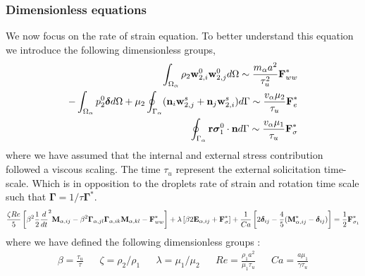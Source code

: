 \subsubsection{Dimensionless equations}
We now focus on the rate of strain equation. 
To better understand this equation we introduce the following dimensionless groups, 
\begin{align*}
    \int_{\Omega_\alpha} \rho_2 \textbf{w}_{2,i}^0\textbf{w}_{2,j}^0 d\Omega
    \sim \frac{m_\alpha a^2}{\tau_u^2} \textbf{F}_{ww}^*
    \\
    - \int_{\Omega_\alpha} p_2^0\bm\delta d\Omega
    + \mu_2 \oint_{\Gamma_\alpha} (\textbf{n}_i \textbf{w}_{2,j}^s + \textbf{n}_j \textbf{w}_{2,i}^s) d\Gamma
    \sim \frac{v_\alpha \mu_2}{\tau_u} \textbf{F}_{e}^*
    \\
    \oint_{\Gamma_\alpha} \textbf r \bm\sigma_1^0 \cdot \textbf{n} d\Gamma
    \sim 
    \frac{v_\alpha \mu_1}{\tau_u} \textbf{F}_{\sigma}^*
\end{align*} 
where we have assumed that the internal and external stress contribution followed a viscous scaling. 
The time $\tau_u$ represent the external solicitation time-scale. 
Which is in opposition to the droplets rate of strain and rotation time scale such that $\bm\Gamma = 1/\tau \bm\Gamma^*$. 
\begin{align*}
    \frac{\zeta Re}{5}\left[
        \beta^2 \frac{1}{2}\frac{d}{dt}^2 \textbf{M}_{\alpha,ij}
    -   \beta^2 \bm\Gamma_{\alpha,jl}\bm\Gamma_{\alpha,ik} \textbf{M}_{\alpha,kl}  
    - \textbf{F}_{ww}^*
    \right]
    + \lambda  \left[
        \beta 2\textbf{E}_{\alpha,ij}
    +  \textbf{F}_\sigma^*
    \right]
    + \frac{1}{Ca} \left[
    2\bm\delta_{ij} 
    - \frac{4  }{5} (\textbf{M}_{\alpha,ij}^* - \bm\delta_{ij})
    \right]
    = 
    \frac{1}{2}
    \textbf{F}_{\sigma_1}^*
\end{align*}
where we have defined the following dimensionless groups : 
\begin{align*}
    \beta = \frac{\tau_u}{\tau}
    && \zeta = \rho_2 /\rho_1
    && \lambda = \mu_1/\mu_2 
    && Re = \frac{\rho_1 a^2 }{ \mu_1 \tau_u}
    && Ca = \frac{a \mu_1}{\gamma \tau_u}
\end{align*}

